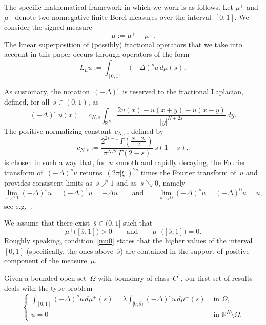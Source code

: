 \documentclass[12pt,a4paper,intlimits,sumlimits]{amsart}
\def \R {\mathbb{R}}
\theoremstyle{definition}
\theoremstyle{plain}
\numberwithin{equation}{section}
\begin{document}
The specific mathematical framework in which we work is as follows.
Let $\mu^+$ and $\mu^-$ denote two nonnegative finite Borel measures over the interval~$[0, 1]$. 
We consider the signed measure
\begin{equation}\label{misure+-}
\mu:=\mu^+ -\mu^-.
\end{equation}
The linear superposition of (possibly) fractional operators that we take into account in this paper
occurs through operators of the form
\begin{equation}\label{superpositionoperator}
L_\mu u:=\int_{[0, 1]} (-\Delta)^s u\, d\mu(s),
\end{equation}

As customary, the notation~$(-\Delta)^s$ is reserved to the fractional Laplacian, defined, for all~$s\in(0,1)$, as
\begin{equation}\label{AMMU0} (- \Delta)^s\, u(x) = c_{N,s}\int_{\R^N} \frac{2u(x) - u(x+y)-u(x-y)}{|y|^{N+2s}}\, dy.
\end{equation}
The positive normalizing constant~$c_{N,s}$, defined by
\begin{equation}\label{defcNs}
c_{N,s}:=\frac{2^{2s-1}\,\Gamma\left(\frac{N+2s}{2}\right)}{\pi^{N/2}\,\Gamma(2-s)}\, s(1-s),
\end{equation}
is chosen in such a way that, for~$u$ smooth and rapidly decaying, the Fourier transform of~$(-\Delta)^s u$ returns~$(2\pi|\xi|)^{2s}$ times the Fourier transform of~$u$ and provides consistent limits as~$s\nearrow1$ and as~$s\searrow0$, namely
\[
\lim_{s\nearrow1}(-\Delta)^su=(-\Delta)^1u=-\Delta u
\qquad{\mbox{and}}\qquad
\lim_{s\searrow0}(-\Delta)^s u=(-\Delta)^0u=u,
\]
see e.g.~\cite{MR2944369}. 

We assume that there exist~$\overline s \in (0, 1]$ such that
\begin{equation}\label{mu0}
\mu^+\big([\overline s, 1]\big)>0
\qquad \mbox{and} \qquad
\mu^-\big([\overline s, 1]\big)=0.
\end{equation}
Roughly speaking, condition~\eqref{mu0} states that the higher values of the interval~$[0,1]$
(specifically, the ones above~$\overline s$)
are contained in the support of positive component of the measure~$\mu$.


Given a bounded open set~$\Omega$ with boundary of class~$C^1$,
our first set of results deals with the type problem
\begin{equation}\label{eigenvalueproblemmu}
\begin{cases}
\displaystyle\int_{[0, 1]} (-\Delta)^s u\, d\mu^+(s) = \lambda \int_{[0, \overline{s})} (-\Delta)^s u\, d\mu^-(s)  &  \mbox{ in } \Omega,
\\
u=0 &\mbox{ in } \R^N \setminus \Omega.
\end{cases}
\end{equation}
\end{document}

